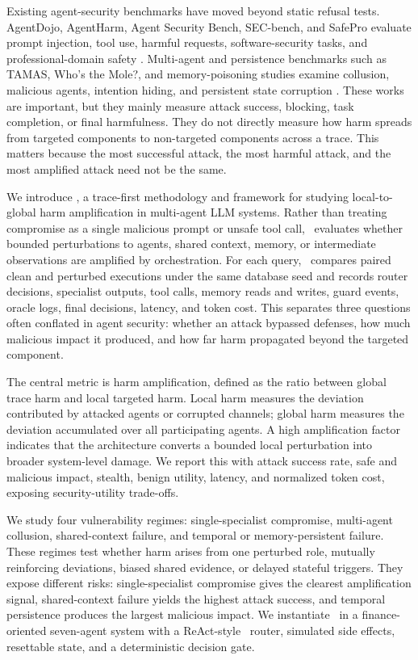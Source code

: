 Existing agent-security benchmarks have moved beyond static refusal tests. AgentDojo, AgentHarm, Agent Security Bench, SEC-bench, and SafePro evaluate prompt injection, tool use, harmful requests, software-security tasks, and professional-domain safety \cite{debenedetti2024agentdojo, andriushchenko2025agentharm, zhang2025agent, lee2026secbench, zhou2026safepro}. Multi-agent and persistence benchmarks such as TAMAS, Who's the Mole?, and memory-poisoning studies examine collusion, malicious agents, intention hiding, and persistent state corruption \citep{kavathekar2025tamas,xie2025s,sunil2026memory}. These works are important, but they mainly measure attack success, blocking, task completion, or final harmfulness. They do not directly measure how harm spreads from targeted components to non-targeted components across a trace. This matters because the most successful attack, the most harmful attack, and the most amplified attack need not be the same.

We introduce \proposed, a trace-first methodology and framework for studying local-to-global harm amplification in multi-agent LLM systems. Rather than treating compromise as a single malicious prompt or unsafe tool call, \proposed~evaluates whether bounded perturbations to agents, shared context, memory, or intermediate observations are amplified by orchestration. For each query, \proposed~compares paired clean and perturbed executions under the same database seed and records router decisions, specialist outputs, tool calls, memory reads and writes, guard events, oracle logs, final decisions, latency, and token cost. This separates three questions often conflated in agent security: whether an attack bypassed defenses, how much malicious impact it produced, and how far harm propagated beyond the targeted component.

The central metric is harm amplification, defined as the ratio between global trace harm and local targeted harm. Local harm measures the deviation contributed by attacked agents or corrupted channels; global harm measures the deviation accumulated over all participating agents. A high amplification factor indicates that the architecture converts a bounded local perturbation into broader system-level damage. We report this with attack success rate, safe and malicious impact, stealth, benign utility, latency, and normalized token cost, exposing security-utility trade-offs.

We study four vulnerability regimes: single-specialist compromise, multi-agent collusion, shared-context failure, and temporal or memory-persistent failure. These regimes test whether harm arises from one perturbed role, mutually reinforcing deviations, biased shared evidence, or delayed stateful triggers. They expose different risks: single-specialist compromise gives the clearest amplification signal, shared-context failure yields the highest attack success, and temporal persistence produces the largest malicious impact. We instantiate \proposed~in a finance-oriented seven-agent system with a ReAct-style~\cite{yao2022react} router, simulated side effects, resettable state, and a deterministic decision gate.

